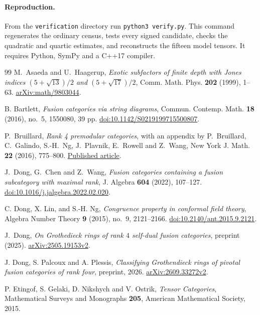 \documentclass[11pt,a4paper]{article}
\theoremstyle{definition}\newtheorem{definition}[theorem]{Definition}
\theoremstyle{remark}\newtheorem{remark}[theorem]{Remark}
\numberwithin{equation}{section}
\begin{document}
\paragraph{Reproduction.}
From the \texttt{verification} directory run \texttt{python3 verify.py}.
This command regenerates the ordinary census, tests every signed candidate,
checks the quadratic and quartic estimates, and reconstructs the fifteen
model tensors. It requires Python, SymPy and a C++17 compiler.
\begingroup\small
\begin{thebibliography}{99}
M.~Asaeda and U.~Haagerup,
\emph{Exotic subfactors of finite depth with Jones indices
$(5+\sqrt{13})/2$ and $(5+\sqrt{17})/2$},
Comm. Math. Phys. \textbf{202} (1999), 1--63.
\href{https://arxiv.org/abs/math/9803044}{arXiv:math/9803044}.

B. Bartlett, \emph{Fusion categories via string diagrams},
Commun. Contemp. Math. \textbf{18} (2016), no.~5, 1550080, 39 pp.
\href{https://doi.org/10.1142/S0219199715500807}{doi:10.1142/S0219199715500807}.

P.~Bruillard, \emph{Rank 4 premodular categories},
with an appendix by P.~Bruillard, C.~Galindo, S.-H.~Ng, J.~Plavnik,
E.~Rowell and Z.~Wang, New York J. Math. \textbf{22} (2016), 775--800.
\href{https://nyjm.albany.edu/j/2016/22-36p.pdf}{Published article}.

J.~Dong, G.~Chen and Z.~Wang, \emph{Fusion categories
containing a fusion subcategory with maximal rank}, J. Algebra
\textbf{604} (2022), 107--127.
\href{https://doi.org/10.1016/j.jalgebra.2022.02.020}{doi:10.1016/j.jalgebra.2022.02.020}.

C. Dong, X. Lin, and S.-H. Ng, \emph{Congruence property in conformal
field theory}, Algebra Number Theory \textbf{9} (2015), no.~9, 2121--2166.
\href{https://doi.org/10.2140/ant.2015.9.2121}{doi:10.2140/ant.2015.9.2121}.

J.~Dong, \emph{On Grothedieck rings of rank $4$
self-dual fusion categories}, preprint (2025).
\href{https://arxiv.org/abs/2505.19153v2}{arXiv:2505.19153v2}.

J. Dong, S. Palcoux and A. Plessis,
\emph{Classifying Grothendieck rings of pivotal fusion categories of rank four},
preprint, 2026.
\href{https://arxiv.org/abs/2609.33272v2}{arXiv:2609.33272v2}.

P. Etingof, S. Gelaki, D. Nikshych and V. Ostrik,
\emph{Tensor Categories}, Mathematical Surveys and Monographs \textbf{205},
American Mathematical Society, 2015.


\end{thebibliography}
\end{document}
